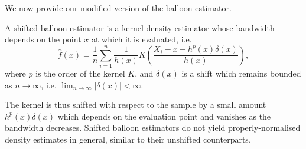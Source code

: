 We now provide our modified version of the balloon estimator.
\begin{defn}
A shifted balloon estimator is a kernel density estimator whose bandwidth depends on the point $x$ at which it is evaluated, i.e. 
\begin{equation}
\hat{f}(x)=\frac{1}{n}\sum_{i=1}^{n}\frac{1}{h(x)}K\left(\frac{X_{i}-x-h^{p}\left(x\right)\delta(x)}{h(x)}\right),\label{eq:balloon-definition}
\end{equation}
where $p$ is the order of the kernel $K$, and $\delta(x)$ is a shift which remains bounded as $n\rightarrow\infty$, i.e. $\lim_{n\rightarrow\infty}\left|\delta\left(x\right)\right|<\infty$.
\end{defn}
The kernel is thus shifted with respect to the sample by a small amount $h^{p}\left(x\right)\delta\left(x\right)$ which depends on the evaluation point and vanishes as the bandwidth decreases. Shifted balloon estimators do not yield properly-normalised density estimates in general, similar to their unshifted counterparts.

